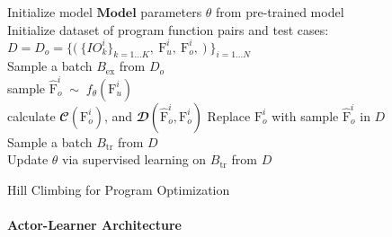 \documentclass{article}
\begin{document}
\begin{algorithm}[t]
\begin{algorithmic}
\STATE Initialize model $\textbf{Model}$ parameters $\theta$ from pre-trained model \\
\STATE Initialize dataset of program function pairs and test cases: \\  
    $D = D_o =  \Big\{ \big( \
    \{IO_k^i\}_{k=1...K}, \
    \textrm{F}_{u}^i, \
    \textrm{F}_{o}^i, \
    \big) \ 
    \Big\}_{i=1...N}$ \\
 \WHILE{not converged}
  \STATE Sample a batch $B_{\mathrm{ex}}$ from $D_o$\\
    \STATE  sample $\hat{\textrm{F}}_{o}^i \; \sim \; f_{\theta}(\textrm{F}_{u}^i)$ \\
    \STATE calculate 
    $\mathbfcal{C}(\textrm{F}_{o}^i)$, 
    and $\mathbfcal{D} (\hat{\textrm{F}}_{o}^i, \textrm{F}_{o}^i)$ 
        \STATE  Replace $\textrm{F}_{o}^i$ with sample $\hat{\textrm{F}}_{o}^i$ in $D$ \\
    \ENDIF
  \ENDFOR
  \STATE Sample a batch $B_{\mathrm{tr}}$ from $D$\\
  \STATE Update $\theta$ via supervised learning on $B_{\mathrm{tr}}$ from $D$ \\
 \ENDWHILE
 \caption{Hill Climbing for Program Optimization}
 \label{alg:hill_climbing}
\end{algorithmic}
\end{algorithm}



\paragraph{Actor-Learner Architecture}
\end{document}
